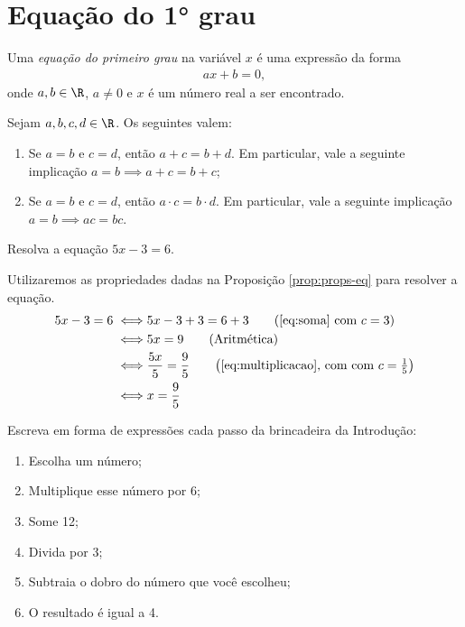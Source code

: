 \section{Equação do 1° grau}

\begin{definition}
Uma \emph{equação do primeiro grau} na variável $x$ é uma expressão da forma
%
\begin{align*}
ax+b=0,
\end{align*}
%
onde $a,b \in \R$, $a \neq 0$ e $x$ é um número real a ser encontrado.
\end{definition}

\begin{proposition}[Propriedades]
\label{prop:props-eq}
Sejam $a, b, c, d \in \R$. Os seguintes valem:
\begin{enumerate}
	\item 
	\label{eq:soma} 
	Se $a = b$ e $c = d$, então $a + c = b + d$. Em particular, vale a seguinte implicação $a=b \implies a+c = b+c$;
	\item 
	\label{eq:multiplicacao}
	Se $a = b$ e $c = d$, então $a \cdot c = b \cdot d$. Em particular, vale a seguinte implicação $a=b \implies ac = bc$.
\end{enumerate}
\end{proposition}

\begin{example}
Resolva a equação $5x-3=6$.
\end{example}

\begin{solution}
Utilizaremos as propriedades dadas na Proposição \ref{prop:props-eq} para resolver a equação.
%
\begin{align*}
5x-3=6 \iff & 5x -3+3=6+3 \tag*{$\left(\text{\ref{eq:soma} com }c = 3\right) $}\\
		 \iff & 5x =9 \tag*{(Aritmética)}\\ 
		 \iff & \frac{5x}{5} =\frac 9 5 \tag*{$\left(\text{\ref{eq:multiplicacao}, com com } c = \frac 1 5 \right) $}\\
		 \iff & x =\frac 9 5 
\end{align*}
\end{solution}

\begin{example}
Escreva em forma de expressões cada passo da brincadeira da Introdução:
\begin{enumerate}[label=\textbf{\arabic*}.]
	\item Escolha um número;
	\item Multiplique esse número por 6;
	\item Some 12;
	\item Divida por 3;
	\item Subtraia o dobro do número que você escolheu;
	\item O resultado é igual a 4.
\end{enumerate}
\end{example}

